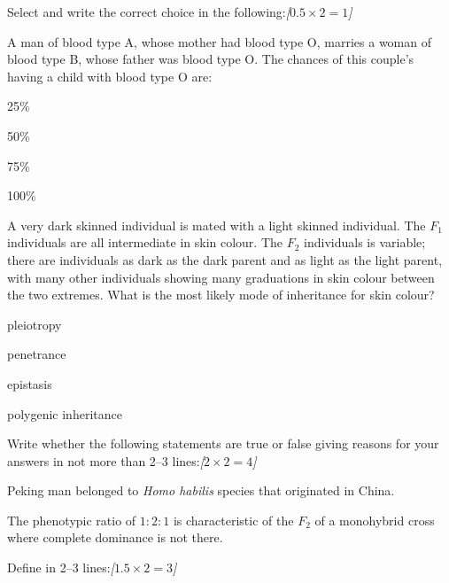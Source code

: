 \documentclass[11pt,a4paper]{article}
\newcommand{\pts}[1]{\hfill   \textit{[#1]}}
\begin{document}
\begin{parts}
  \item Select and write the correct choice in the following:\pts{$0.5  \times 2 = 1$}
  
\begin{parts}
    \item A man of blood type A, whose mother had blood type O, marries a woman of blood type B, whose father was blood type O. The chances of this couple's having a child with blood type O are:
    
\begin{parts}
      \item 25\%
      \item 50\%
      \item 75\%
      \item 100\%
    \end{parts}
    
    \item A very dark skinned individual is mated with a light skinned individual. The $F_1$ individuals are all intermediate in skin colour. The $F_2$ individuals is variable; there are individuals as dark as the dark parent and as light as the light parent, with many other individuals showing many graduations in skin colour between the two extremes. What is the most likely mode of inheritance for skin colour?
    
\begin{parts}
      \item pleiotropy
      \item penetrance
      \item epistasis
      \item polygenic inheritance
    \end{parts}
  \end{parts}

  \item Write whether the following statements are true or false giving reasons for your answers in not more than 2--3 lines:\pts{$2  \times 2 = 4$}
  
\begin{parts}
    \item Peking man belonged to   \textit{Homo habilis} species that originated in China.
    \item The phenotypic ratio of $1:2:1$ is characteristic of the $F_2$ of a monohybrid cross where complete dominance is not there.
  \end{parts}

  \item Define in 2--3 lines:\pts{$1.5  \times 2 = 3$}
  

\end{parts}
\end{document}
